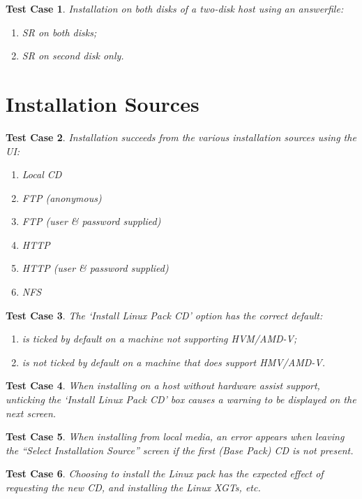 \documentclass[a4paper]{article}
\newtheorem{testcase}{Test Case}
\begin{document}
\begin{testcase}
Installation on both disks of a two-disk host using an answerfile:
\begin{enumerate}
\item SR on both disks;
\item SR on second disk only.
\end{enumerate}
\end{testcase}

\section{Installation Sources}

\begin{testcase}
Installation succeeds from the various installation sources using the
UI:
\begin{enumerate}
\item Local CD
\item FTP (anonymous)
\item FTP (user \& password supplied)
\item HTTP
\item HTTP (user \& password supplied)
\item NFS
\end{enumerate}
\end{testcase}

\begin{testcase}
The `Install Linux Pack CD' option has the correct default:
\begin{enumerate}
\item is ticked by default on a machine not supporting HVM/AMD-V;
\item is not ticked by default on a machine that does support HMV/AMD-V.
\end{enumerate}
\end{testcase}

\begin{testcase}
When installing on a host without hardware assist support, unticking
the `Install Linux Pack CD' box causes a warning to be displayed on
the next screen.
\end{testcase}

\begin{testcase}
When installing from local media, an error appears when leaving the
``Select Installation Source'' screen if the first (Base Pack) CD is
not present.
\end{testcase}

\begin{testcase}
Choosing to install the Linux pack has the expected effect of
requesting the new CD, and installing the Linux XGTs, etc.
\end{testcase}
\end{document}
